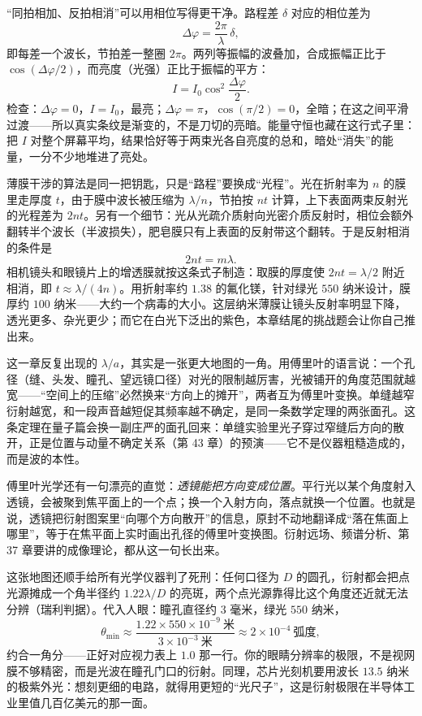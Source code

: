 \begin{mathbridge}
“同拍相加、反拍相消”可以用相位写得更干净。路程差 \(\delta\) 对应的相位差为
\[
  \Delta\varphi = \frac{2\pi}{\lambda}\,\delta ,
\]
即每差一个波长，节拍差一整圈 \(2\pi\)。两列等振幅的波叠加，合成振幅正比于 \(\cos(\Delta\varphi/2)\)，而亮度（光强）正比于振幅的平方：
\[
  I = I_0\cos^2\!\frac{\Delta\varphi}{2}.
\]
检查：\(\Delta\varphi=0\)，\(I=I_0\)，最亮；\(\Delta\varphi=\pi\)，\(\cos(\pi/2)=0\)，全暗；在这之间平滑过渡——所以真实条纹是渐变的，不是刀切的亮暗。能量守恒也藏在这行式子里：把 \(I\) 对整个屏幕平均，结果恰好等于两束光各自亮度的总和，暗处“消失”的能量，一分不少地堆进了亮处。

薄膜干涉的算法是同一把钥匙，只是“路程”要换成“光程”。光在折射率为 \(n\) 的膜里走厚度 \(t\)，由于膜中波长被压缩为 \(\lambda/n\)，节拍按 \(nt\) 计算，上下表面两束反射光的光程差为 \(2nt\)。另有一个细节：光从光疏介质射向光密介质反射时，相位会额外翻转半个波长（半波损失），肥皂膜只有上表面的反射带这个翻转。于是反射相消的条件是
\[
  2nt = m\lambda .
\]
相机镜头和眼镜片上的增透膜就按这条式子制造：取膜的厚度使 \(2nt=\lambda/2\) 附近相消，即 \(t\approx \lambda/(4n)\)。用折射率约 \(1.38\) 的氟化镁，针对绿光 \(550\) 纳米设计，膜厚约 \(100\) 纳米——大约一个病毒的大小。这层纳米薄膜让镜头反射率明显下降，透光更多、杂光更少；而它在白光下泛出的紫色，本章结尾的挑战题会让你自己推出来。
\end{mathbridge}

\begin{challenge}
这一章反复出现的 \(\lambda/a\)，其实是一张更大地图的一角。用傅里叶的语言说：一个孔径（缝、头发、瞳孔、望远镜口径）对光的限制越厉害，光被铺开的角度范围就越宽——“空间上的压缩”必然换来“方向上的摊开”，两者互为傅里叶变换。单缝越窄衍射越宽，和一段声音越短促其频率越不确定，是同一条数学定理的两张面孔。这条定理在量子篇会换一副庄严的面孔回来：单缝实验里光子穿过窄缝后方向的散开，正是位置与动量不确定关系（第 43 章）的预演——它不是仪器粗糙造成的，而是波的本性。

傅里叶光学还有一句漂亮的直觉：\emph{透镜能把方向变成位置}。平行光以某个角度射入透镜，会被聚到焦平面上的一个点；换一个入射方向，落点就换一个位置。也就是说，透镜把衍射图案里“向哪个方向散开”的信息，原封不动地翻译成“落在焦面上哪里”，等于在焦平面上实时画出孔径的傅里叶变换图。衍射远场、频谱分析、第 37 章要讲的成像理论，都从这一句长出来。

这张地图还顺手给所有光学仪器判了死刑：任何口径为 \(D\) 的圆孔，衍射都会把点光源摊成一个角半径约 \(1.22\lambda/D\) 的亮斑，两个点光源靠得比这个角度还近就无法分辨（瑞利判据）。代入人眼：瞳孔直径约 \(3\) 毫米，绿光 \(550\) 纳米，
\[
  \theta_{\min} \approx \frac{1.22\times 550\times10^{-9}\ \text{米}}{3\times10^{-3}\ \text{米}}
  \approx 2\times10^{-4}\ \text{弧度},
\]
约合一角分——正好对应视力表上 \(1.0\) 那一行。你的眼睛分辨率的极限，不是视网膜不够精密，而是光波在瞳孔门口的衍射。同理，芯片光刻机要用波长 \(13.5\) 纳米的极紫外光：想刻更细的电路，就得用更短的“光尺子”，这是衍射极限在半导体工业里值几百亿美元的那一面。
\end{challenge}

